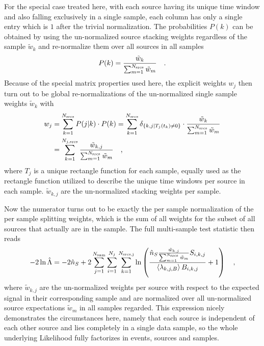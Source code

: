 For the special case treated here, with each source having its unique time window and also falling exclusively in a single sample, each column has only a single entry which is $1$ after the trivial normalization. 
The probabilities $P(k)$ can be obtained by using the un-normalized source stacking weights regardless of the sample $\tilde{w}_k$ and re-normalize them over all sources in all samples
\begin{equation}
  P(k) = \frac{\tilde{w}_k}{\sum_{m=1}^{N_\text{srcs}} \tilde{w}_m}
  \quad\text{.}
\end{equation}
Because of the special matrix properties used here, the explicit weights $w_j$ then turn out to be global re-normalizations of the un-normalized single sample weights $\tilde{w}_k$ with
\begin{align}
  w_j
    &= \sum_{k=1}^{N_\text{srcs}} P(j|k)\cdot P(k)
    = \sum_{k=1}^{N_\text{srcs}}
      \delta_{\{k,j|T_j(t_k)\neq 0\}} \cdot
      \frac{\tilde{w}_k}{\sum_{m=1}^{N_\text{srcs}} \tilde{w}_m} \\
    &= \sum_{k=1}^{N_{j,\text{srcs}}}
      \frac{\tilde{w}_{k,j}}{\sum_{m=1}^{N_\text{srcs}} \tilde{w}_m}
  \quad\text{,}
\end{align}
where $T_j$ is a unique rectangle function for each sample, equally used as the rectangle function utilized to describe the unique time windows per source in each sample.
$\tilde{w}_{k,j}$ are the un-normalized stacking weights per sample.

Now the numerator turns out to be exactly the per sample normalization of the per sample splitting weights, which is the sum of all weights for the subset of all sources that actually are in the sample.
The full multi-sample test statistic then reads
\begin{equation}
  -2\ln\hat{\Lambda}
  = -2\hat{n}_S +
      2\sum_{j=1}^{N_\text{sam}} \sum_{i=1}^{N_j} \sum_{k=1}^{N_\text{srcs,j}}
      \ln\left(
        \frac{\hat{n}_{S}\frac{\tilde{w}_{k,j}}{\sum_{m=1}^{N_\text{srcs}}
              \tilde{w}_m} S_{i,k,j}}
             {\Braket{\lambda_{k,j,B}} B_{i,k,j}}
        + 1
      \right)
  \quad\text{,}
\end{equation}
where $\tilde{w}_{k,j}$ are the un-normalized weights per source with respect to the expected signal in their corresponding sample and are normalized over all un-normalized source expectations $\tilde{w}_m$ in all samples regarded.
This expression nicely demonstrates the circumstances here, namely that each source is independent of each other source and lies completely in a single data sample, so the whole underlying Likelihood fully factorizes in events, sources and samples.


